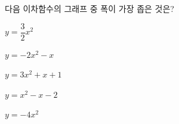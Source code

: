 다음 이차함수의 그래프 중 폭이 가장 좁은 것은?
\begin{choicesii}{\rule[-3ex]{0pt}{8ex}$y=\dfrac{3}{2}x^2$}{\rule[-3ex]{0pt}{8ex}$y=-2x^2-x$}{\rule[-3ex]{0pt}{8ex}$y=3x^2+x+1$}{\rule[-3ex]{0pt}{8ex}$y=x^2-x-2$}{\rule[-3ex]{0pt}{8ex}$y=-4x^2$}\end{choicesii}
